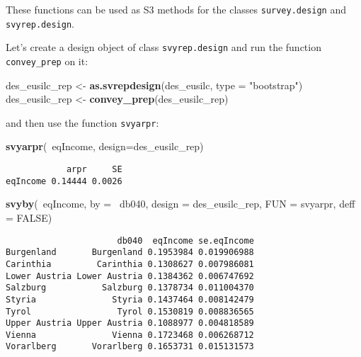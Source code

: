 \documentclass[]{book}
\newenvironment{Shaded}{\begin{snugshade}}{\end{snugshade}}
\newcommand{\KeywordTok}[1]{\textcolor[rgb]{0.13,0.29,0.53}{\textbf{{#1}}}}
\newcommand{\DataTypeTok}[1]{\textcolor[rgb]{0.13,0.29,0.53}{{#1}}}
\newcommand{\StringTok}[1]{\textcolor[rgb]{0.31,0.60,0.02}{{#1}}}
\newcommand{\OtherTok}[1]{\textcolor[rgb]{0.56,0.35,0.01}{{#1}}}
\newcommand{\NormalTok}[1]{{#1}}
\theoremstyle{definition}
\theoremstyle{definition}
\theoremstyle{remark}
\begin{document}
These functions can be used as S3 methods for the classes
\texttt{survey.design} and \texttt{svyrep.design}.

Let's create a design object of class \texttt{svyrep.design} and run the
function \texttt{convey\_prep} on it:

\begin{Shaded}
\begin{Highlighting}[]
\NormalTok{des_eusilc_rep <-}\StringTok{ }\KeywordTok{as.svrepdesign}\NormalTok{(des_eusilc, }\DataTypeTok{type =} \StringTok{"bootstrap"}\NormalTok{)}
\NormalTok{des_eusilc_rep <-}\StringTok{ }\KeywordTok{convey_prep}\NormalTok{(des_eusilc_rep) }
\end{Highlighting}
\end{Shaded}

and then use the function \texttt{svyarpr}:

\begin{Shaded}
\begin{Highlighting}[]
\KeywordTok{svyarpr}\NormalTok{(~eqIncome, }\DataTypeTok{design=}\NormalTok{des_eusilc_rep)}
\end{Highlighting}
\end{Shaded}

\begin{verbatim}
            arpr     SE
eqIncome 0.14444 0.0026
\end{verbatim}

\begin{Shaded}
\begin{Highlighting}[]
\KeywordTok{svyby}\NormalTok{(~eqIncome, }\DataTypeTok{by =} \NormalTok{~db040, }\DataTypeTok{design =} \NormalTok{des_eusilc_rep, }\DataTypeTok{FUN =} \NormalTok{svyarpr, }\DataTypeTok{deff =} \OtherTok{FALSE}\NormalTok{)}
\end{Highlighting}
\end{Shaded}

\begin{verbatim}
                      db040  eqIncome se.eqIncome
Burgenland       Burgenland 0.1953984 0.019906988
Carinthia         Carinthia 0.1308627 0.007986081
Lower Austria Lower Austria 0.1384362 0.006747692
Salzburg           Salzburg 0.1378734 0.011004370
Styria               Styria 0.1437464 0.008142479
Tyrol                 Tyrol 0.1530819 0.008836565
Upper Austria Upper Austria 0.1088977 0.004818589
Vienna               Vienna 0.1723468 0.006268712
Vorarlberg       Vorarlberg 0.1653731 0.015131573
\end{verbatim}
\end{document}
